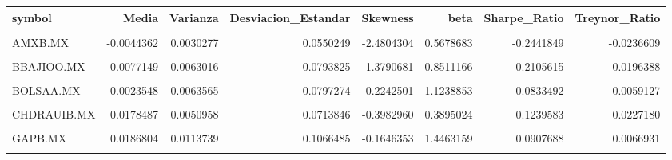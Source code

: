 \begin{table}
\centering
\begin{tabular}{lrrrrrrr}
\toprule
symbol & Media & Varianza & Desviacion\_Estandar & Skewness & beta & Sharpe\_Ratio & Treynor\_Ratio\\
\midrule
\cellcolor{gray!10}{ALSEA.MX} & \cellcolor{gray!10}{0.0169691} & \cellcolor{gray!10}{0.0095732} & \cellcolor{gray!10}{0.0978429} & \cellcolor{gray!10}{0.6021922} & \cellcolor{gray!10}{1.3147851} & \cellcolor{gray!10}{0.0814474} & \cellcolor{gray!10}{0.0060611}\\
AMXB.MX & -0.0044362 & 0.0030277 & 0.0550249 & -2.4804304 & 0.5678683 & -0.2441849 & -0.0236609\\
\cellcolor{gray!10}{ASURB.MX} & \cellcolor{gray!10}{0.0097172} & \cellcolor{gray!10}{0.0044938} & \cellcolor{gray!10}{0.0670355} & \cellcolor{gray!10}{1.1072963} & \cellcolor{gray!10}{0.8743091} & \cellcolor{gray!10}{0.0106989} & \cellcolor{gray!10}{0.0008203}\\
BBAJIOO.MX & -0.0077149 & 0.0063016 & 0.0793825 & 1.3790681 & 0.8511166 & -0.2105615 & -0.0196388\\
\cellcolor{gray!10}{BIMBOA.MX} & \cellcolor{gray!10}{-0.0123918} & \cellcolor{gray!10}{0.0058850} & \cellcolor{gray!10}{0.0767135} & \cellcolor{gray!10}{0.7901121} & \cellcolor{gray!10}{1.2228697} & \cellcolor{gray!10}{-0.2788533} & \cellcolor{gray!10}{-0.0174931}\\
\addlinespace
BOLSAA.MX & 0.0023548 & 0.0063565 & 0.0797274 & 0.2242501 & 1.1238853 & -0.0833492 & -0.0059127\\
\cellcolor{gray!10}{CEMEXCPO.MX} & \cellcolor{gray!10}{0.0253631} & \cellcolor{gray!10}{0.0095231} & \cellcolor{gray!10}{0.0975865} & \cellcolor{gray!10}{0.0160103} & \cellcolor{gray!10}{1.8438509} & \cellcolor{gray!10}{0.1676785} & \cellcolor{gray!10}{0.0088744}\\
CHDRAUIB.MX & 0.0178487 & 0.0050958 & 0.0713846 & -0.3982960 & 0.3895024 & 0.1239583 & 0.0227180\\
\cellcolor{gray!10}{CUERVO.MX} & \cellcolor{gray!10}{-0.0247853} & \cellcolor{gray!10}{0.0109234} & \cellcolor{gray!10}{0.1045151} & \cellcolor{gray!10}{0.1894085} & \cellcolor{gray!10}{0.3206234} & \cellcolor{gray!10}{-0.3232578} & \cellcolor{gray!10}{-0.1053738}\\
GAPB.MX & 0.0186804 & 0.0113739 & 0.1066485 & -0.1646353 & 1.4463159 & 0.0907688 & 0.0066931\\
\addlinespace
\cellcolor{gray!10}{GCARSOA1.MX} & \cellcolor{gray!10}{0.0195597} & \cellcolor{gray!10}{0.0122334} & \cellcolor{gray!10}{0.1106047} & \cellcolor{gray!10}{1.3356137} & \cellcolor{gray!10}{1.8108379} & \cellcolor{gray!10}{0.0954728} & \cellcolor{gray!10}{0.0058314}\\

\end{tabular}
\end{table}
